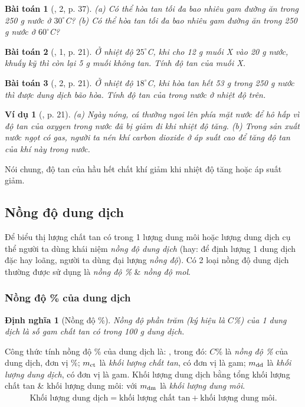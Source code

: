 \documentclass{article}
\newtheorem{baitoan}{Bài toán}
\newtheorem{dinhnghia}{Định nghĩa}
\newtheorem{vidu}{Ví dụ}
\begin{document}
\begin{baitoan}[\cite{SGK_KHTN_8_Canh_Dieu}, 2, p. 37]
	(a) Có thể hòa tan tối đa bao nhiêu gam đường ăn trong \emph{250 g} nước ở $30^\circ$\emph{C}? (b) Có thể hòa tan tối đa bao nhiêu gam đường ăn trong \emph{250 g} nước ở $60^\circ$\emph{C}?
\end{baitoan}

\begin{baitoan}[\cite{SGK_KHTN_8_KNTTVCS}, 1, p. 21]
	Ở nhiệt độ $25^\circ$\emph{C}, khi cho \emph{12 g} muối X vào \emph{20 g} nước, khuấy kỹ thì còn lại \emph{5 g} muối không tan. Tính độ tan của muối X.
\end{baitoan}

\begin{baitoan}[\cite{SGK_KHTN_8_KNTTVCS}, 2, p. 21]
	Ở nhiệt độ $18^\circ$\emph{C}, khi hòa tan hết \emph{53 g} \emph{} trong \emph{250 g} nước thì được dung dịch bão hòa. Tính độ tan của \emph{} trong nước ở nhiệt độ trên.
\end{baitoan}

\begin{vidu}[\cite{SGK_KHTN_8_KNTTVCS}, p. 21]
	(a) Ngày nóng, cá thường ngoi lên phía mặt nước để hô hấp vì độ tan của oxygen trong nước đã bị giảm đi khi nhiệt độ tăng. (b) Trong sản xuất nước ngọt có gas, người ta nén khí carbon dioxide ở áp suất cao để tăng độ tan của khí này trong nước.
\end{vidu}
Nói chung, độ tan của hầu hết chất khí giảm khi nhiệt độ tăng hoặc áp suất giảm.

\subsection{Nồng độ dung dịch}
Để biểu thị lượng chất tan có trong 1 lượng dung môi hoặc lượng dung dịch cụ thể người ta dùng khái niệm \textit{nồng độ dung dịch} (hay: để định lượng 1 dung dịch đặc hay loãng, người ta dùng đại lượng \textit{nồng độ}). Có 2 loại nồng độ dung dịch thường được sử dụng là \textit{nồng độ \%} \& \textit{nồng độ mol}.

\subsubsection{Nồng độ \% của dung dịch}

\begin{dinhnghia}[Nồng độ \%]
	\emph{Nồng độ phần trăm} (ký hiệu là $C$\%) của 1 dung dịch là số gam chất tan có trong \emph{100 g} dung dịch.
\end{dinhnghia}
Công thức tính nồng độ \% của dung dịch là: , trong đó: $C$\% là \textit{nồng độ \%} của dung dịch, đơn vị \%; $m_{\rm ct}$ là \textit{khối lượng chất tan}, có đơn vị là gam; $m_{\rm dd}$ là \textit{khối lượng dung dịch}, có đơn vị là gam. Khối lượng dung dịch bằng tổng khối lượng chất tan \& khối lượng dung môi:  với $m_{\rm dm}$ là \textit{khối lượng dung môi}.
\begin{align*}
	\mbox{Khối lượng dung dịch} = \mbox{khối lượng chất tan} + \mbox{khối lượng dung môi}.
\end{align*}
\end{document}
